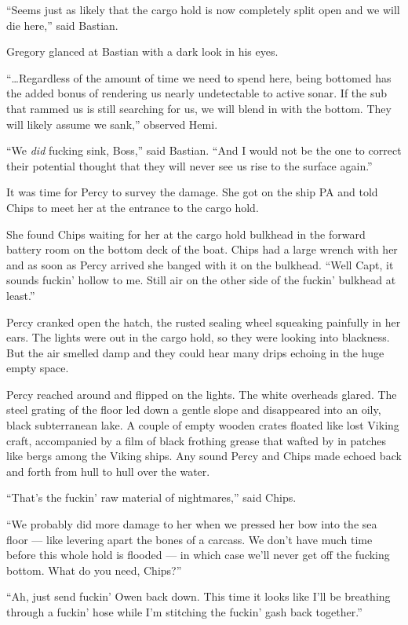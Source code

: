 \documentclass[
]{scrbook}
\begin{document}
``Seems just as likely that the cargo hold is now completely split open
and we will die here,'' said Bastian.

Gregory glanced at Bastian with a dark look in his eyes.

``\ldots Regardless of the amount of time we need to spend here, being
bottomed has the added bonus of rendering us nearly undetectable to
active sonar. If the sub that rammed us is still searching for us, we
will blend in with the bottom. They will likely assume we sank,''
observed Hemi.

``We \emph{did} fucking sink, Boss,'' said Bastian. ``And I would not be
the one to correct their potential thought that they will never see us
rise to the surface again.''

It was time for Percy to survey the damage. She got on the ship PA and
told Chips to meet her at the entrance to the cargo hold.

\bigskip

She found Chips waiting for her at the cargo hold bulkhead in the
forward battery room on the bottom deck of the boat. Chips had a large
wrench with her and as soon as Percy arrived she banged with it on the
bulkhead. ``Well Capt, it sounds fuckin' hollow to me. Still air on the
other side of the fuckin' bulkhead at least.''

Percy cranked open the hatch, the rusted sealing wheel squeaking
painfully in her ears. The lights were out in the cargo hold, so they
were looking into blackness. But the air smelled damp and they could
hear many drips echoing in the huge empty space.

Percy reached around and flipped on the lights. The white overheads
glared. The steel grating of the floor led down a gentle slope and
disappeared into an oily, black subterranean lake. A couple of empty
wooden crates floated like lost Viking craft, accompanied by a film of
black frothing grease that wafted by in patches like bergs among the
Viking ships. Any sound Percy and Chips made echoed back and forth from
hull to hull over the water.

``That's the fuckin' raw material of nightmares,'' said Chips.

``We probably did more damage to her when we pressed her bow into the
sea floor --- like levering apart the bones of a carcass. We don't have
much time before this whole hold is flooded --- in which case we'll
never get off the fucking bottom. What do you need, Chips?''

``Ah, just send fuckin' Owen back down. This time it looks like I'll be
breathing through a fuckin' hose while I'm stitching the fuckin' gash
back together.''
\end{document}
